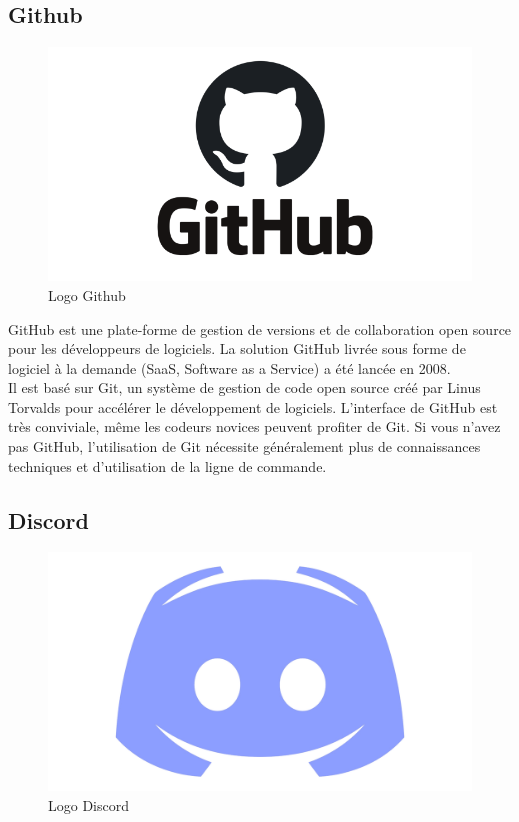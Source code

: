     \subsection{Github}
    \begin{figure}[H]
        \centering
        \includegraphics[scale=0.4]{ACR/Github-Logo.png}
        \caption{Logo Github}
    \end{figure}

    GitHub\cite{github} est une plate-forme de gestion de versions et de collaboration open source pour les développeurs de logiciels. La solution GitHub livrée sous forme de logiciel à la demande (SaaS, Software as a Service) a été lancée en 2008.\\
    
    Il est basé sur Git, un système de gestion de code open source créé par Linus Torvalds pour accélérer le développement de logiciels. L'interface de GitHub est très conviviale, même les codeurs novices peuvent profiter de Git. Si vous n'avez pas GitHub, l'utilisation de Git nécessite généralement plus de connaissances techniques et d'utilisation de la ligne de commande.\\

    \subsection{Discord}
    \begin{figure}[H]
        \centering
        \includegraphics[scale=0.09]{ACR/Discord-Logo.png}
        \caption{Logo Discord}
    \end{figure}
    
